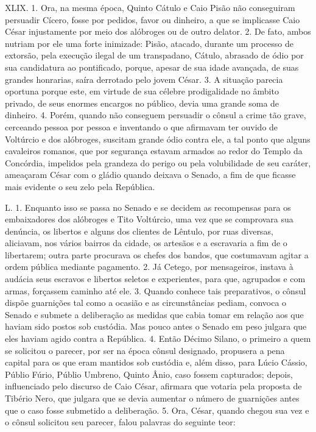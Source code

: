 XLIX. 1. Ora, na mesma época, Quinto Cátulo e Caio Pisão não conseguiram
persuadir Cícero, fosse por pedidos, favor ou dinheiro, a que se implicasse
Caio César injustamente por meio dos alóbroges ou de outro delator. 2. De fato,
ambos nutriam por ele uma forte inimizade: Pisão, atacado, durante um processo
de extorsão, pela execução ilegal de um transpadano, Cátulo, abrasado de ódio
por sua candidatura ao pontificado, porque, apesar de sua idade avançada, de
suas grandes honrarias, saíra derrotado pelo jovem César. 3. A situação parecia
oportuna porque este, em virtude de sua célebre prodigalidade no âmbito
privado, de seus enormes encargos no público, devia uma grande soma de
dinheiro. 4. Porém, quando não conseguem persuadir o cônsul a crime tão grave,
cerceando pessoa por pessoa e inventando o que afirmavam ter ouvido de
Voltúrcio e dos alóbroges, suscitam grande ódio contra ele, a tal ponto que
alguns cavaleiros romanos, que por segurança estavam armados ao redor do Templo
da Concórdia, impelidos pela grandeza do perigo ou pela volubilidade de seu caráter, ameaçaram César com o gládio quando deixava o Senado, a fim de que
ficasse mais evidente o seu zelo pela República. 

L. 1. Enquanto isso se passa no Senado e se decidem as recompensas para os
embaixadores dos alóbroges e Tito Voltúrcio, uma vez que se comprovara sua
denúncia, os libertos e alguns dos clientes de Lêntulo, por ruas diversas,
aliciavam, nos vários bairros da cidade, os artesãos e a escravaria a fim de o
libertarem; outra parte procurava os chefes dos bandos, que costumavam agitar a
ordem pública mediante pagamento. 2. Já Cetego, por mensageiros, instava à
audácia seus escravos e libertos seletos e experientes, para que, agrupados e
com armas, forçassem caminho até ele. 3. Quando conhece tais preparativos, o
cônsul dispõe guarnições tal como a ocasião e as circunstâncias pediam, convoca
o Senado e submete a deliberação as medidas que cabia tomar em relação aos que
haviam sido postos sob custódia. Mas pouco antes o Senado em peso julgara que
eles haviam agido contra a República. 4. Então Décimo Silano, o primeiro a quem
se solicitou o parecer, por ser na época cônsul designado, propusera a pena
capital para os que eram mantidos sob custódia e, além disso, para Lúcio
Cássio, Públio Fúrio, Públio Umbreno, Quinto Ânio, caso fossem capturados;
depois, influenciado pelo discurso de Caio César, afirmara que votaria pela
proposta de Tibério Nero, que julgara que se devia aumentar o número de
guarnições antes que o caso fosse submetido a deliberação. 5. Ora, César,
quando chegou sua vez e o cônsul solicitou seu parecer, falou palavras do
seguinte teor:

